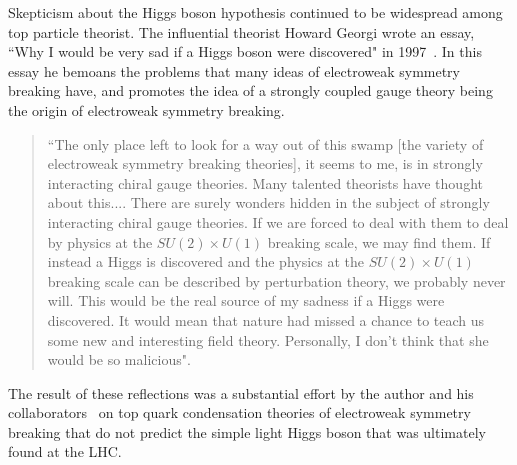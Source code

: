 \documentclass[letter,12pt]{article}
\begin{document}
Skepticism about the Higgs boson hypothesis continued to be widespread among top particle theorist. The influential theorist Howard Georgi wrote an essay, ``Why I would be very sad if a Higgs boson were discovered" in 1997~\cite{Georgi:1997}. In this essay he bemoans the problems that many ideas of electroweak symmetry breaking have, and promotes the idea of a strongly coupled gauge theory being the origin of electroweak symmetry breaking. 
\begin{quote}
``The only place left to look for a way out of this swamp [the variety of electroweak symmetry breaking theories], it seems to me, is in strongly interacting chiral gauge theories. Many talented theorists have thought about this.... There are surely wonders hidden in the subject of strongly interacting chiral gauge theories. If we are forced to deal with them to deal by physics at the $SU(2)\times U(1)$ breaking scale, we may find them. If instead a Higgs is discovered and the physics at the $SU(2)\times U(1)$ breaking scale can be described by perturbation theory, we probably never will. This would be the real source of my sadness if a Higgs were discovered. It would mean that nature had missed a chance to teach us some new and interesting field theory. Personally, I don't think that she would be so malicious"\cite{Georgi:1997}.
\end{quote}
The result of these reflections was a substantial effort by the author and his collaborators~\cite{Collins:1999rz,Chivukula:1998wd} on top quark condensation theories of electroweak symmetry breaking that do not predict the simple light Higgs boson that was ultimately found at the LHC.
\end{document}
